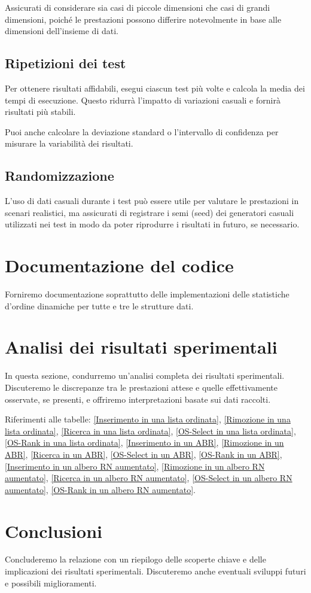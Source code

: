 \documentclass[twocolumn]{article}
\begin{document}
Assicurati di considerare sia casi di piccole dimensioni che casi di grandi dimensioni, poiché le prestazioni possono differire notevolmente in base alle dimensioni dell'insieme di dati.

\subsection{Ripetizioni dei test}

Per ottenere risultati affidabili, esegui ciascun test più volte e calcola la media dei tempi di esecuzione. Questo ridurrà l'impatto di variazioni casuali e fornirà risultati più stabili.

Puoi anche calcolare la deviazione standard o l'intervallo di confidenza per misurare la variabilità dei risultati.

\subsection{Randomizzazione}

L'uso di dati casuali durante i test può essere utile per valutare le prestazioni in scenari realistici, ma assicurati di registrare i semi (seed) dei generatori casuali utilizzati nei test in modo da poter riprodurre i risultati in futuro, se necessario.

\section{Documentazione del codice}

Forniremo documentazione soprattutto delle implementazioni delle statistiche d'ordine dinamiche per tutte e tre le strutture dati.

\section{Analisi dei risultati sperimentali}

In questa sezione, condurremo un'analisi completa dei risultati sperimentali. Discuteremo le discrepanze tra le prestazioni attese e quelle effettivamente osservate, se presenti, e offriremo interpretazioni basate sui dati raccolti.

Riferimenti alle tabelle: \ref{Inserimento in una lista ordinata}, \ref{Rimozione in una lista ordinata}, \ref{Ricerca in una lista ordinata}, \ref{OS-Select in una lista ordinata}, \ref{OS-Rank in una lista ordinata}, \ref{Inserimento in un ABR}, \ref{Rimozione in un ABR}, \ref{Ricerca in un ABR}, \ref{OS-Select in un ABR}, \ref{OS-Rank in un ABR}, \ref{Inserimento in un albero RN aumentato}, \ref{Rimozione in un albero RN aumentato}, \ref{Ricerca in un albero RN aumentato}, \ref{OS-Select in un albero RN aumentato}, \ref{OS-Rank in un albero RN aumentato}.

\section{Conclusioni}

Concluderemo la relazione con un riepilogo delle scoperte chiave e delle implicazioni dei risultati sperimentali. Discuteremo anche eventuali sviluppi futuri e possibili miglioramenti.

\newpage



\end{document}
